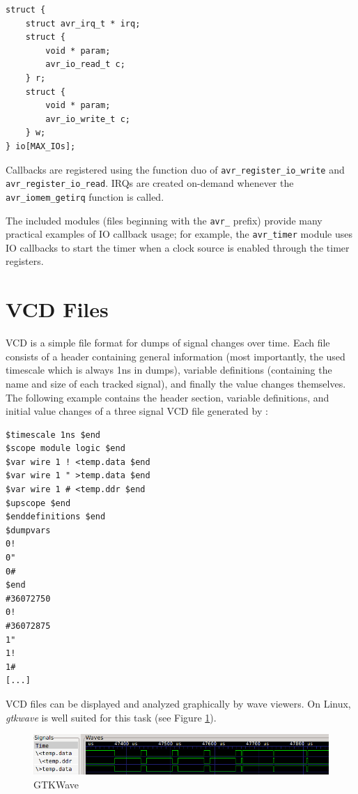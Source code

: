 \begin{lstlisting}
struct {
    struct avr_irq_t * irq;
    struct {
        void * param;
        avr_io_read_t c;
    } r;
    struct {
        void * param;
        avr_io_write_t c;
    } w;
} io[MAX_IOs];
\end{lstlisting}

Callbacks are registered using the function duo of \lstinline|avr_register_io_write|
and \lstinline|avr_register_io_read|. \acp{IRQ} are created on-demand whenever
the \lstinline|avr_iomem_getirq| function is called.

The included \simavr modules (files beginning with the \verb|avr_| prefix)
provide many practical examples of \ac{IO} callback usage; for example,
the \verb|avr_timer| module uses \ac{IO} callbacks to start the timer when
a clock source is enabled through the timer registers.

\section{\acf{VCD} Files}

\ac{VCD} is a simple file format for dumps of signal changes over time. Each file
consists of a header containing general information (most importantly, the
used timescale which is always 1ns in \simavr dumps), variable definitions
(containing the name and size of each tracked signal), and finally the value
changes themselves. The following example contains the header section, variable
definitions, and initial value changes of a three signal \ac{VCD} file generated
by \simavr:

\begin{verbatim}
$timescale 1ns $end
$scope module logic $end
$var wire 1 ! <temp.data $end
$var wire 1 " >temp.data $end
$var wire 1 # <temp.ddr $end
$upscope $end
$enddefinitions $end
$dumpvars
0!
0"
0#
$end
#36072750
0!
#36072875
1"
1!
1#
[...]
\end{verbatim}


\ac{VCD} files can be displayed and analyzed graphically by wave viewers. On Linux,
\emph{gtkwave} is well suited for this task (see Figure \ref{fig:gtkwave}).

\begin{figure}
\includegraphics[width=\textwidth]{images/gtkwave}
\caption{GTKWave}
\label{fig:gtkwave}
\end{figure}

